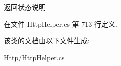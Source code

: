 返回状态说明 



在文件 Http\-Helper.\-cs 第 713 行定义.



该类的文档由以下文件生成\-:\begin{DoxyCompactItemize}
\item 
Http/\hyperlink{_http_helper_8cs}{Http\-Helper.\-cs}\end{DoxyCompactItemize}
